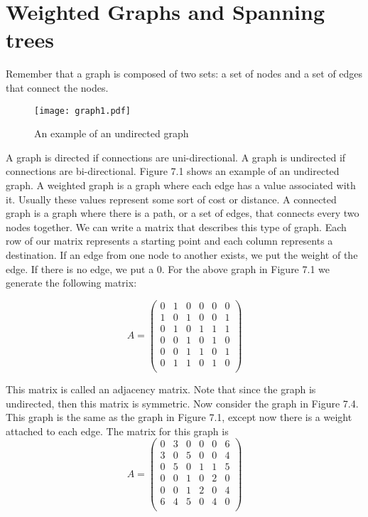 
\label{Ch:Kruskal}


\section*{Weighted Graphs and Spanning trees}

Remember that a graph is composed of two sets: a set of nodes and a set of edges that connect the nodes.

\begin{figure}[H]
\texttt{[image: graph1.pdf]}
\caption{An example of an undirected graph}
\label{mst:graph1}
\end{figure}

A graph is directed if connections are uni-directional.
A graph is undirected if connections are bi-directional.
Figure 7.1 shows an example of an undirected graph.
A weighted graph is a graph where each edge has a value associated with it.
Usually these values represent some sort of cost or distance.
A connected graph is a graph where there is a path, or a set of edges, that connects every two nodes together.
We can write a matrix that describes this type of graph.
Each row of our matrix represents a starting point and each column represents a destination.
If an edge from one node to another exists, we put the weight of the edge.
If there is no edge, we put a 0.
For the above graph in Figure 7.1 we generate the following matrix:

\[
A = \begin{pmatrix}
0 & 1 & 0 & 0 & 0 & 0\\
1 & 0 & 1 & 0 & 0 & 1\\
0 & 1 & 0 & 1 & 1 & 1\\
0 & 0 & 1 & 0 & 1 & 0\\
0 & 0 & 1 & 1 & 0 & 1\\
0 & 1 & 1 & 0 & 1 & 0\\
\end{pmatrix}
\]

This matrix is called an adjacency matrix.
Note that since the graph is undirected, then this matrix is symmetric.
Now consider the graph in Figure 7.4.  This graph is the same as the graph in Figure 7.1, except now there is a weight attached to each edge.  The matrix for this graph is
\[
A = \begin{pmatrix}
0 & 3 & 0 & 0 & 0 & 6\\
3 & 0 & 5 & 0 & 0 & 4\\
0 & 5 & 0 & 1 & 1 & 5\\
0 & 0 & 1 & 0 & 2 & 0\\
0 & 0 & 1 & 2 & 0 & 4\\
6 & 4 & 5 & 0 & 4 & 0\\
\end{pmatrix}
\]

